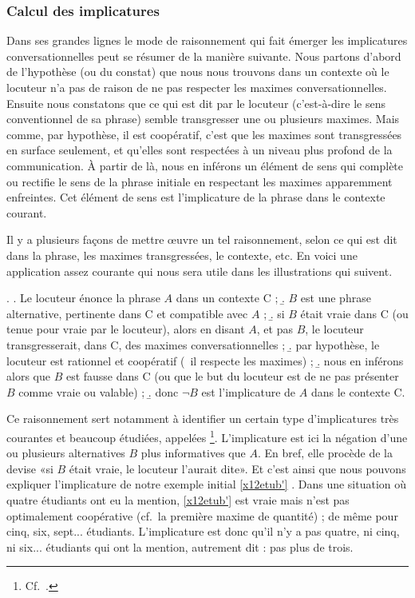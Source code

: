 \begin{refsegment}
\subsubsection{Calcul des implicatures}

Dans ses grandes lignes le mode de raisonnement qui fait émerger les implicatures conversationnelles peut se résumer de la manière suivante.
Nous partons d'abord de l'hypothèse (ou du constat) que nous nous trouvons dans un contexte où le locuteur n'a pas de raison de ne pas respecter les maximes conversationnelles.  Ensuite nous constatons que ce qui est dit par le locuteur (c'est-à-dire le sens conventionnel de sa phrase) semble transgresser une ou plusieurs maximes. Mais comme, par hypothèse, il est coopératif, c'est que les maximes sont transgressées en surface seulement, et qu'elles sont respectées à un niveau plus profond de la communication.  À partir de là, nous en inférons un élément de sens qui complète ou rectifie le sens de la phrase initiale en respectant les maximes apparemment enfreintes.  Cet élément de sens est l'implicature de la phrase dans le contexte courant.

Il y a plusieurs façons de mettre \oe uvre un tel raisonnement, selon ce qui est dit dans la phrase, les maximes transgressées, le contexte, etc.  En voici une application assez courante qui nous sera utile dans les illustrations qui suivent.

\ex. \label{raisonIC}
\a. Le locuteur énonce la phrase $A$ dans un contexte C ;
\b. $B$ est une phrase alternative, pertinente dans C et compatible avec $A$ ; %
\b. si $B$ était vraie dans C (ou tenue pour vraie par le locuteur), alors en disant $A$, et pas $B$, le locuteur transgresserait, dans C, des maximes conversationnelles ; \label{raisonICc}
\b. par hypothèse, le locuteur est  rationnel et coopératif (\ie\ il respecte les maximes) ;
\b. nous en inférons alors que $B$ est fausse dans C (ou que le but du locuteur est de ne pas présenter $B$ comme vraie ou valable) ;
\b. donc $\neg B$ est l'implicature %
de $A$ dans le contexte C. 


Ce raisonnement sert notamment à identifier un certain type d'implicatures très courantes et beaucoup étudiées, appelées \footnote{Cf.\ \citet{Horn:72,Horn:89}.}.  L'implicature est ici la négation d'une ou plusieurs alternatives $B$ plus informatives que $A$.  
En bref, elle procède de la devise «si $B$ était vraie, le locuteur l'aurait dite».
Et c'est ainsi que nous pouvons expliquer l'implicature de notre exemple initial \ref{x12etub'} .  Dans une situation où quatre étudiants ont eu la mention, \ref{x12etub'} est vraie mais n'est pas optimalement coopérative (cf.\ la première maxime de quantité) ; de même pour cinq, six, sept... étudiants.  L'implicature est donc qu'il n'y a pas quatre, ni cinq, ni six... étudiants qui ont la mention, autrement dit : pas plus de trois.


\end{refsegment}
